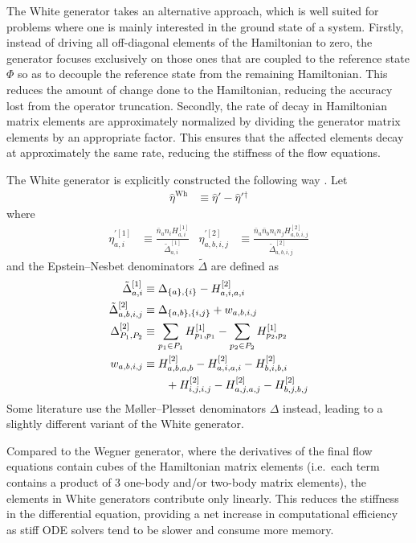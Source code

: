 The White generator takes an alternative approach, which is well suited for problems where one is mainly interested in the ground state of a system.  Firstly, instead of driving all off-diagonal elements of the Hamiltonian to zero, the generator focuses exclusively on those ones that are coupled to the reference state $\Phi$ so as to decouple the reference state from the remaining Hamiltonian.  This reduces the amount of change done to the Hamiltonian, reducing the accuracy lost from the operator truncation.  Secondly, the rate of decay in Hamiltonian matrix elements are approximately normalized by dividing the generator matrix elements by an appropriate factor.  This ensures that the affected elements decay at approximately the same rate, reducing the stiffness of the flow equations.

The White generator is explicitly constructed the following way \cite{PhysRevLett.106.222502,White:cond-mat0201346}.  Let
\begin{align*}
\hat{\eta}^{\text{Wh}} &\equiv \hat{\eta}' - \hat{\eta}'{}^\dagger
\end{align*}
where
\begin{align*}
\eta^{\prime [1]}_{a, i} &\equiv \frac{\bar{n}_a n_i H^{[1]}_{a, i}}{\tilde{\Delta}^{[1]}_{a, i}} &
\eta^{\prime [2]}_{a, b, i, j} &\equiv \frac{\bar{n}_a \bar{n}_b n_i n_j H^{[2]}_{a, b, i, j}}{\tilde{\Delta}^{[2]}_{a, b, i, j}}
\end{align*}
and the Epstein--Nesbet denominators $\tilde{\Delta}$ are defined as
\begin{align}
\tilde{\Delta}^{[1]}_{a, i} &\equiv \Delta_{\{a\}, \{i\}} - H^{[2]}_{a, i, a, i} \notag \\
\tilde{\Delta}^{[2]}_{a, b, i, j} &\equiv \Delta_{\{a, b\}, \{i, j\}} + w_{a, b, i, j} \notag \\
\Delta^{[2]}_{P_1, P_2} &\equiv \sum_{p_1 \in P_1} H^{[1]}_{p_1, p_1} - \sum_{p_2 \in P_2} H^{[1]}_{p_2, p_2} \label{eq:moellerplessetdenominator} \\
w_{a, b, i, j}
  &\equiv H^{[2]}_{a, b, a, b} - H^{[2]}_{a, i, a, i} - H^{[2]}_{b, i, b, i} \notag \\
  &\qquad + H^{[2]}_{i, j, i, j} - H^{[2]}_{a, j, a, j} - H^{[2]}_{b, j, b, j} \notag
\end{align}
Some literature use the M\o ller--Plesset denominators $\Delta$ instead, leading to a slightly different variant of the White generator.

Compared to the Wegner generator, where the derivatives of the final flow equations contain cubes of the Hamiltonian matrix elements (i.e.\ each term contains a product of 3 one-body and/or two-body matrix elements), the elements in White generators contribute only linearly.  This reduces the stiffness in the differential equation, providing a net increase in computational efficiency as stiff ODE solvers tend to be slower and consume more memory.

